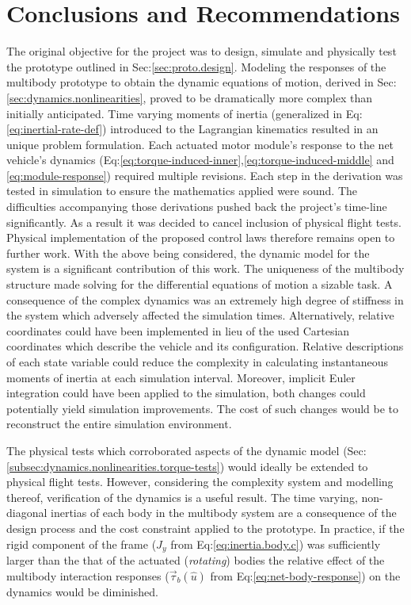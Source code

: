 \chapter{Conclusions and Recommendations}
\label{ch:conclusion}
The original objective for the project was to design, simulate and physically test the prototype outlined in Sec:\ref{sec:proto.design}. Modeling the responses of the multibody prototype to obtain the dynamic equations of motion, derived in Sec:\ref{sec:dynamics.nonlinearities}, proved to be dramatically more complex than initially anticipated. 
Time varying moments of inertia (generalized in Eq:\ref{eq:inertial-rate-def}) introduced to the Lagrangian kinematics resulted in an unique problem formulation. Each actuated motor module's response to the net vehicle's dynamics (Eq:\ref{eq:torque-induced-inner},\ref{eq:torque-induced-middle} and \ref{eq:module-response}) required multiple revisions. Each step in the derivation was tested in simulation to ensure the mathematics applied were sound. The difficulties accompanying those derivations pushed back the project's time-line significantly. As a result it was decided to cancel inclusion of physical flight tests. Physical implementation of the proposed control laws therefore remains open to further work.  With the above being considered, the dynamic model for the system is a significant contribution of this work. The uniqueness of the multibody structure made solving for the differential equations of motion a sizable task. A consequence of the complex dynamics was an extremely high degree of stiffness in the system which adversely affected the simulation times. Alternatively, relative coordinates could have been implemented in lieu of the used Cartesian coordinates which describe the vehicle and its configuration. Relative descriptions of each state variable could reduce the complexity in calculating instantaneous moments of inertia at each simulation interval. Moreover, implicit Euler integration could have been applied to the simulation, both changes could potentially yield simulation improvements. The cost of such changes would be to reconstruct the entire simulation environment.
\par
The physical tests which corroborated aspects of the dynamic model (Sec:\ref{subsec:dynamics.nonlinearities.torque-tests}) would ideally be extended to physical flight tests. However, considering the complexity system and modelling thereof, verification of the dynamics is a useful result. The time varying, non-diagonal inertias of each body  in the multibody system are a consequence of the design process and the cost constraint applied to the prototype. In practice, if the rigid component of the frame ($J_y$ from Eq:\ref{eq:inertia.body.c}) was sufficiently larger than the that of the actuated (\emph{rotating}) bodies the relative effect of the multibody interaction responses ($\vec{\tau}_b(\hat{u})$ from Eq:\ref{eq:net-body-response}) on the dynamics would be diminished.
